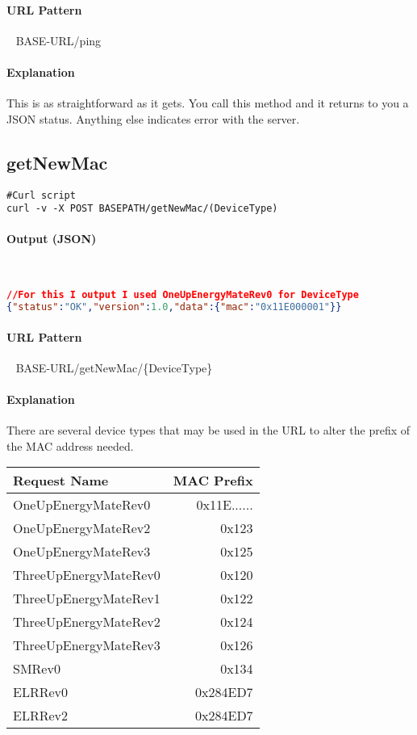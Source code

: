 \documentclass[
10pt, %
letterpaper, %
oneside, %
headinclude,footinclude, %
BCOR5mm, %
]{scrartcl}
\begin{document}
\paragraph{URL Pattern} 
~\newline
BASE-URL/ping

\paragraph{Explanation}
This is as straightforward as it gets. You call this method and it returns to you a JSON status. Anything else indicates error with the server.


\subsection{getNewMac}
\begin{lstlisting}
#Curl script 
curl -v -X POST BASEPATH/getNewMac/(DeviceType)
\end{lstlisting}

\paragraph{Output (JSON)}~
\begin{lstlisting}[language=json]
//For this I output I used OneUpEnergyMateRev0 for DeviceType
{"status":"OK","version":1.0,"data":{"mac":"0x11E000001"}}
\end{lstlisting}

\paragraph{URL Pattern} 
~\newline
BASE-URL/getNewMac/\{DeviceType\}

\paragraph{Explanation}
There are several device types that may be used in the URL to alter the prefix of the MAC address needed.
~\newline
\begin{tabular}{| l | r |}
\hline
\textbf{Request Name} & \textbf{MAC Prefix} \\
\hline
OneUpEnergyMateRev0 & 0x11E...... \\
OneUpEnergyMateRev2 & 0x123 \\
OneUpEnergyMateRev3 & 0x125 \\
ThreeUpEnergyMateRev0 & 0x120 \\
ThreeUpEnergyMateRev1 & 0x122 \\
ThreeUpEnergyMateRev2 & 0x124 \\
ThreeUpEnergyMateRev3 & 0x126 \\
SMRev0 & 0x134 \\
ELRRev0 &  0x284ED7 \\
ELRRev2 & 0x284ED7 \\
\hline
\end{tabular}
\end{document}
